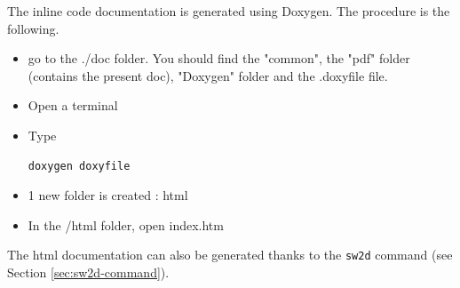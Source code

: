 The inline code documentation is generated using Doxygen.
The procedure is the following.
\begin{itemize}
\item go to the ./doc folder. You should find the "common", the "pdf" folder (contains the present doc), "Doxygen" folder and the .doxyfile file.
\item Open a terminal
\item Type
\begin{verbatim}
doxygen doxyfile
\end{verbatim}
\item 1 new folder is created : html
\item In the /html folder, open index.htm
\end{itemize}

The html documentation can also be generated thanks to the \texttt{sw2d} command (see Section \ref{sec:sw2d-command}).